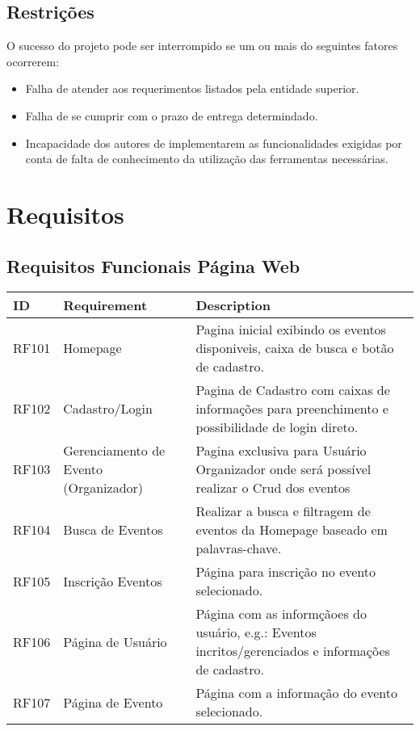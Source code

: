 \section{Restrições}
    O sucesso do projeto pode ser interrompido se um ou mais do seguintes fatores ocorrerem:
    \begin{itemize}
        \item Falha de atender aos requerimentos listados pela entidade superior.
        \item Falha de se cumprir com o prazo de entrega determindado.
        \item Incapacidade dos autores de implementarem as funcionalidades exigidas por conta de falta de conhecimento da utilização das ferramentas necessárias.
    \end{itemize}

\newpage

\chapter{Requisitos}
\label{Requisitos}

\section{Requisitos Funcionais Página Web}

\begin{tabular}{>{\raggedright}p{1.5cm}>{\raggedright}p{4cm}>{\raggedright}p{10cm}}
\toprule
\textbf{ID} & \textbf{Requirement} & \textbf{Description} \tabularnewline 
\midrule
  RF101 & Homepage & Pagina inicial exibindo os eventos disponiveis, caixa de busca e botão de cadastro.\tabularnewline \hline
  RF102 & Cadastro/Login & Pagina de Cadastro com caixas de informações para preenchimento e possibilidade de login direto.\tabularnewline \hline
  RF103 & Gerenciamento de Evento (Organizador) & Pagina exclusiva para Usuário Organizador onde será possível realizar o Crud dos eventos\tabularnewline \hline 
  RF104 & Busca de Eventos & Realizar a busca e filtragem de eventos da Homepage baseado em palavras-chave.\tabularnewline \hline
  RF105 & Inscrição Eventos & Página para inscrição no evento selecionado.\tabularnewline \hline
  RF106 & Página de Usuário & Página com as informçãoes do usuário, e.g.: Eventos incritos/gerenciados e informações de cadastro.\tabularnewline \hline
  RF107 & Página de Evento & Página com a informação do evento selecionado.\tabularnewline
\bottomrule
\end{tabular}


